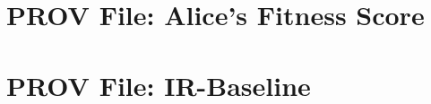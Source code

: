 \newcommand{\multipdf}[3][]{
	\label{sec:#2}
	
	
}

\newcommand{\singlepdf}[2]{
	
}

\begin{appendices}
	\renewcommand{\thesection}{\appendixname~\Alph{section}}

	\singlepdf{Provenance Primer}{pdfs/provenance-primer.pdf}

	\multipdf{Interview Questionnaire}{pdfs/questionnaire.pdf}

	\section{PROV File: Alice's Fitness Score}
	\label{sec:prov_file_fitness_score}
	
	

	\clearpage

	\section{PROV File: IR-Baseline}
	\label{sec:prov_file_ir_baseline}
	
	

\end{appendices}

